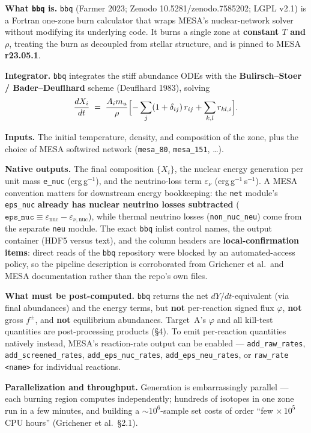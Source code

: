 \documentclass[11pt]{article}
\newcommand{\bbq}{\texttt{bbq}}
\begin{document}
\textbf{What \bbq{} is.} \bbq{} (Farmer 2023; Zenodo 10.5281/zenodo.7585202; LGPL v2.1) is a Fortran one-zone burn calculator that wraps MESA's nuclear-network solver without modifying its underlying code. It burns a single zone at \textbf{constant $T$ and $\rho$}, treating the burn as decoupled from stellar structure, and is pinned to MESA \textbf{r23.05.1}.

\textbf{Integrator.} \bbq{} integrates the stiff abundance ODEs with the \textbf{Bulirsch--Stoer / Bader--Deuflhard} scheme (Deuflhard 1983), solving
\[
\frac{dX_i}{dt} \;=\; \frac{A_i m_u}{\rho}\Bigl[-\sum_j (1+\delta_{ij})\, r_{ij} + \sum_{k,l} r_{kl,i}\Bigr].
\]

\textbf{Inputs.} The initial temperature, density, and composition of the zone, plus the choice of MESA softwired network (\texttt{mesa\_80}, \texttt{mesa\_151}, \dots).

\textbf{Native outputs.} The final composition $\{X_i\}$, the nuclear energy generation per unit mass \texttt{e\_nuc} (erg\,g$^{-1}$), and the neutrino-loss term $\varepsilon_\nu$ (erg\,g$^{-1}$\,s$^{-1}$). A MESA convention matters for downstream energy bookkeeping: the \texttt{net} module's \texttt{eps\_nuc} \textbf{already has nuclear neutrino losses subtracted} ($\texttt{eps\_nuc} \equiv \varepsilon_{\mathrm{nuc}} - \varepsilon_{\nu,\mathrm{nuc}}$), while thermal neutrino losses (\texttt{non\_nuc\_neu}) come from the separate \texttt{neu} module. The exact \bbq{} inlist control names, the output container (HDF5 versus text), and the column headers are \textbf{local-confirmation items}: direct reads of the \bbq{} repository were blocked by an automated-access policy, so the pipeline description is corroborated from Grichener et al.\ and MESA documentation rather than the repo's own files.

\textbf{What must be post-computed.} \bbq{} returns the net $dY/dt$-equivalent (via final abundances) and the energy terms, but \textbf{not} per-reaction signed flux $\varphi$, \textbf{not} gross $f^{\pm}$, and \textbf{not} equilibrium abundances. Target~A's $\varphi$ and all kill-test quantities are post-processing products (\S4). To emit per-reaction quantities natively instead, MESA's reaction-rate output can be enabled --- \texttt{add\_raw\_rates}, \texttt{add\_screened\_rates}, \texttt{add\_eps\_nuc\_rates}, \texttt{add\_eps\_neu\_rates}, or \texttt{raw\_rate <name>} for individual reactions.

\textbf{Parallelization and throughput.} Generation is embarrassingly parallel --- each burning region computes independently; hundreds of isotopes in one zone run in a few minutes, and building a $\sim 10^6$-sample set costs of order ``few $\times\,10^5$ CPU hours'' (Grichener et al.\ \S2.1).
\end{document}

